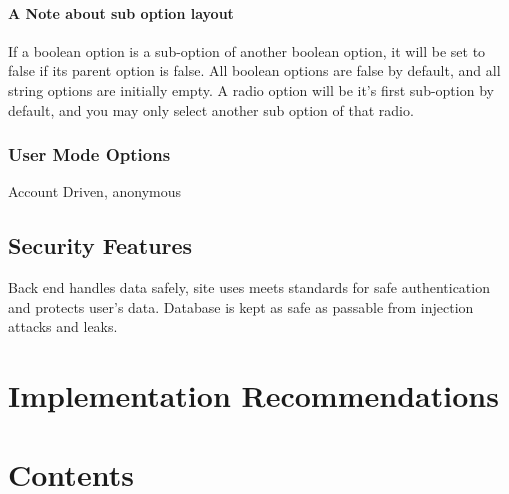 \documentclass[]{article}
\begin{document}
\paragraph{A Note about sub option layout}
If a boolean option is a sub-option of another boolean option, it will be set to false if its parent option is false. All boolean options are false by default, and all string options are initially empty. A radio option will be it's first sub-option by default, and you may only select another sub option of that radio.
\\

\subsubsection{User Mode Options}
Account Driven, anonymous 

\subsection{Security Features}
Back end handles data safely, site uses meets standards for safe authentication and protects user's data. Database is kept as safe as passable from injection attacks and leaks. 



\section{Implementation Recommendations}
\newpage
\section{Contents}\label{cont}
\tableofcontents
\end{document}
